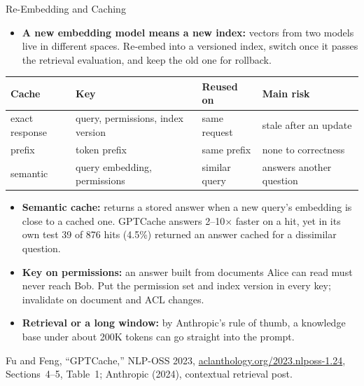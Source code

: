 \begin{frame}{Re-Embedding and Caching}
  \begin{itemize}\footnotesize
    \item[\textcolor{red}{$\blacktriangleright$}] \textbf{A new embedding model means a new index:} vectors from two models live in different spaces. Re-embed into a versioned index, switch once it passes the retrieval evaluation, and keep the old one for rollback.
  \end{itemize}
  \vspace{0.1em}
  {\centering\scriptsize
  \begin{tabular}{llll}
    \toprule
    \textbf{Cache} & \textbf{Key} & \textbf{Reused on} & \textbf{Main risk} \\
    \midrule
    exact response & query, permissions, index version & same request & stale after an update \\
    prefix & token prefix & same prefix & none to correctness \\
    semantic & query embedding, permissions & similar query & answers another question \\
    \bottomrule
  \end{tabular}\par}
  \vspace{0.2em}
  \begin{itemize}\footnotesize\itemsep0.3em
    \item[\textcolor{red}{$\blacktriangleright$}] \textbf{Semantic cache:} returns a stored answer when a new query's embedding is close to a cached one. GPTCache answers 2--10$\times$ faster on a hit, yet in its own test 39 of 876 hits (4.5\%) returned an answer cached for a dissimilar question.
    \item[\textcolor{red}{$\blacktriangleright$}] \textbf{Key on permissions:} an answer built from documents Alice can read must never reach Bob. Put the permission set and index version in every key; invalidate on document and ACL changes.
    \item[\textcolor{red}{$\blacktriangleright$}] \textbf{Retrieval or a long window:} by Anthropic's rule of thumb, a knowledge base under about 200K tokens can go straight into the prompt.
  \end{itemize}
  \vspace{0.1em}
  {\scriptsize Fu and Feng, ``GPTCache,'' NLP-OSS 2023, \href{https://aclanthology.org/2023.nlposs-1.24/}{aclanthology.org/2023.nlposs-1.24}, Sections~4--5, Table~1; Anthropic (2024), contextual retrieval post.\par}
\end{frame}

